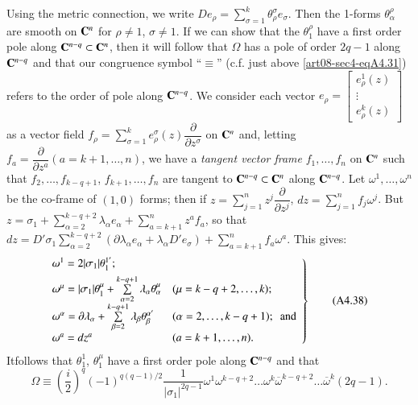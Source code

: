 Using the metric connection, we write $De_{\rho}=\sum\limits^{k}_{\sigma=1}\theta^{\sigma}_{\rho}e_{\sigma}$. Then the 1-forms $\theta^{\rho}_{\alpha}$ are smooth on $\mathbf{C}^{n}$ for $\rho\neq 1$, $\sigma\neq 1$. If we can show that the $\theta^{\rho}_{1}$ have a first order pole along $\mathbf{C}^{n-q}\subset \mathbf{C}^{n}$, then it will follow that $\Omega$ has a pole of order $2q-1$ along $\mathbf{C}^{n-q}$ and that our congruence symbol ``$\equiv$'' (c.f. just above \eqref{art08-sec4-eqA4.31}) refers to the order of pole along $\mathbf{C}^{n-q}$. We consider each vector $e_{\rho}=\left[\begin{smallmatrix} e^{1}_{\rho}(z)\\\vdots\\e^{k}_{\rho}(z)\end{smallmatrix}\right]$ as a vector field $f_{\rho}=\sum\limits^{k}_{\sigma=1}e^{\sigma}_{\rho}(z)\dfrac{\partial}{\partial z^{\sigma}}$ on $\mathbf{C}^{n}$ and, letting $f_{a}=\dfrac{\partial}{\partial z^{a}}(a=k+1,\ldots,n)$, we have a {\em tangent vector frame} $f_{1},\ldots,f_{n}$ on $\mathbf{C}^{n}$ such that $f_{2},\ldots,f_{k-q+1}$, $f_{k+1},\ldots,f_{n}$ are tangent to $\mathbf{C}^{n-q}\subset \mathbf{C}^{n}$ along $\mathbf{C}^{n-q}$. Let $\omega^{1},\ldots,\omega^{n}$ be the co-frame of $(1,0)$ forms; then if $z=\sum\limits^{n}_{j=1}z^{j}\dfrac{\partial}{\partial z^{j}}$, $dz=\sum\limits^{n}_{j=1}f_{j}\omega^{j}$. But $z=\sigma_{1}+\sum\limits^{k-q+2}_{\alpha=2}\lambda_{\alpha}e_{\alpha}+\sum\limits^{n}_{a=k+1}z^{a}f_{a}$, so that $dz=D'\sigma_{1}\sum\limits^{k-q+2}_{\alpha=2}(\partial \lambda_{\alpha}e_{\alpha}+\lambda_{\alpha}D'e_{\sigma})+\sum\limits^{n}_{a=k+1}f_{a}\omega^{a}$. This gives:
\begin{equation*}
\left.
\begin{array}{@{}ll}
\omega^{1}=2|\sigma_{1}|\theta^{1'}_{1}; & \\[4pt]
\omega^{\mu}=|\sigma_{1}|\theta^{\mu}_{1}+\sum\limits^{k-q+1}_{\alpha=2}\lambda_{\alpha}\theta^{\mu}_{\alpha} & (\mu=k-q+2,\ldots,k);\\[4pt]
\omega^{\alpha}=\partial \lambda_{\alpha}+\sum\limits^{k-q+1}_{\beta=2}\lambda_{\beta}\theta^{\alpha'}_{\beta} & (\alpha=2,\ldots,k-q+1);\text{~ and}\\
\omega^{a}= dz^{a} & (a=k+1,\ldots,n).
\end{array}
\right\}\tag{A4.38}\label{art08-sec4-eqA4.38}
\end{equation*}
It\pageoriginale follows that $\theta^{1}_{1}$, $\theta^{\mu}_{1}$ have a first order pole along $\mathbf{C}^{n-q}$ and that 
\begin{equation*}
\Omega\equiv \left(\dfrac{i}{2}\right)^{q}(-1)^{q(q-1)/2}\dfrac{1}{|\sigma_{1}|^{2q-1}}\omega^{1}\omega^{k-q+2}\ldots\omega^{k}\overline{\omega}^{k-q+2}\ldots\overline{\omega}^{k}(2q-1).\tag{A4.39}\label{art08-sec4-eqA4.39}
\end{equation*}

